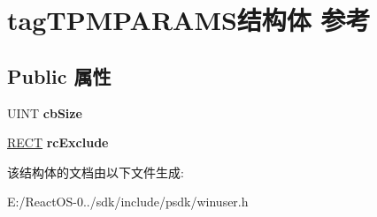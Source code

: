 \hypertarget{structtag_t_p_m_p_a_r_a_m_s}{}\section{tag\+T\+P\+M\+P\+A\+R\+A\+M\+S结构体 参考}
\label{structtag_t_p_m_p_a_r_a_m_s}
\subsection*{Public 属性}
\begin{DoxyCompactItemize}
\item 
\mbox{\label{structtag_t_p_m_p_a_r_a_m_s_ace1c8abfa82b43e721d261acb6e65dc4}} 
U\+I\+NT {\bfseries cb\+Size}
\item 
\mbox{\label{structtag_t_p_m_p_a_r_a_m_s_a6edc3d33b87123d3f9c768510d244a7a}} 
\hyperlink{structtag_r_e_c_t}{R\+E\+CT} {\bfseries rc\+Exclude}
\end{DoxyCompactItemize}


该结构体的文档由以下文件生成\+:\begin{DoxyCompactItemize}
\item 
E\+:/\+React\+O\+S-\/0../sdk/include/psdk/winuser.\+h\end{DoxyCompactItemize}
